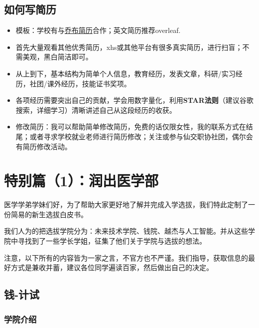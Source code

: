 \documentclass[zihao=-4,fontset=none]{Beautybook-CN}
\begin{document}
\section{如何写简历}
\begin{itemize}
\item 模板：学校有与\href{https://cv.qiaobutang.com/school/sign/wechat}{乔布简历}合作；英文简历推荐overleaf.
\item 首先大量观看其他优秀简历，xhs或其他平台有很多真实简历，进行扫盲；不需美观，黑白简洁即可。
\item 从上到下，基本结构为简单个人信息，教育经历，发表文章，科研/实习经历，社团/课外经历，技能证书奖项。
\item 各项经历需要突出自己的贡献，学会用数字量化，利用\textbf{STAR法则}（建议谷歌搜索，详细学习）清晰讲述自己从这段经历的收获。
\item 修改简历：我可以帮助简单修改简历，免费的话仅限女性，我的联系方式在结尾；或者寻求学校就业老师进行简历修改；关注或参与仙交职协社团，偶尔会有简历修改活动。
\end{itemize}
\chapter{特别篇（1）：润出医学部}

医学学弟学妹们好，为了帮助大家更好地了解并完成入学选拔，我们特此定制了一份简易的新生选拔白皮书。

我们人为的把选拔学院分为：未来技术学院、钱院、越杰与人工智能。并从这些学院中寻找到了一些学长学姐，征集了他们关于学院与选拔的想法。

注意，以下所有的内容皆为一家之言，不官方也不严谨。我们指导，获取信息的最好方式是兼收并蓄，建议各位同学遍读百家，然后做出自己的决定。

\section{钱-计试}

\subsection{学院介绍}
\end{document}
